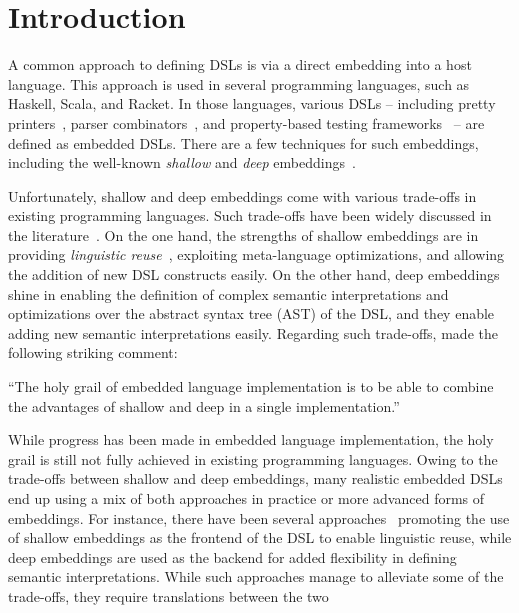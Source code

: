 \section{Introduction} \label{sec:problem}

A common approach to defining DSLs is via a direct embedding into a host
language. This approach is used in several programming languages, such as
Haskell, Scala, and Racket. In those languages, various DSLs -- including pretty
printers~\citep{hughes1995design,wadler2003prettier}, parser
combinators~\citep{leijen2001parsec}, and property-based testing
frameworks~\citep{claessen2000quickcheck} -- are defined as embedded DSLs. There
are a few techniques for such embeddings, including the well-known
\emph{shallow} and \emph{deep} embeddings~\citep{boulton1992experience}.

Unfortunately, shallow and deep embeddings come with various trade-offs in
existing programming languages. Such trade-offs have been widely discussed in
the literature~\citep{rompf2012scala,scherr2014implicit,gibbons2014folding}. On
the one hand, the strengths of shallow embeddings are in providing
\emph{linguistic reuse}~\citep{krishnamurthi2001linguistic}, exploiting
meta-language optimizations, and allowing the addition of new DSL constructs
easily. On the other hand, deep embeddings shine in enabling the definition of
complex semantic interpretations and optimizations over the abstract syntax tree
(AST) of the DSL, and they enable adding new semantic interpretations easily.
Regarding such trade-offs, \citet{svenningsson2015combining} made the following
striking comment:
\begin{quoting}
``The holy grail of embedded language implementation is to be able to
combine the advantages of shallow and deep in a single implementation.''
\end{quoting}
While progress has been made in embedded language implementation, the holy grail
is still not fully achieved in existing programming languages. Owing to the
trade-offs between shallow and deep embeddings, many realistic embedded DSLs end
up using a mix of both approaches in practice or more advanced forms of
embeddings. For instance, there have been several
approaches~\citep{rompf2012scala,svenningsson2015combining,jovanovic2014yinyang}
promoting the use of shallow embeddings as the frontend of the DSL to enable
linguistic reuse, while deep embeddings are used as the backend for added
flexibility in defining semantic interpretations. While such approaches manage
to alleviate some of the trade-offs, they require translations between the two
